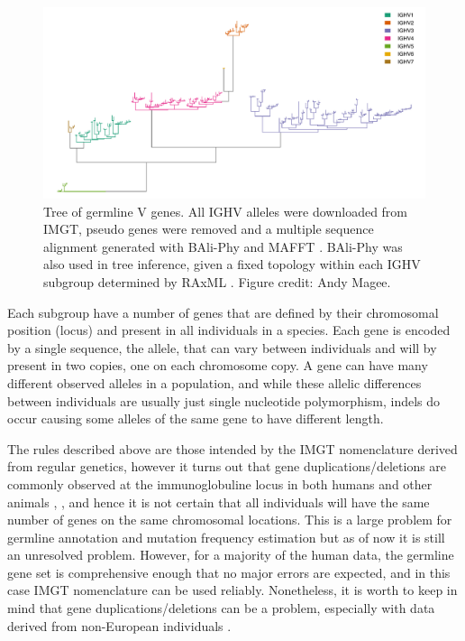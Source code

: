 \begin{figure}
    \centering
    \includegraphics[width=1\textwidth]{figures/tree_right_side_up.pdf}
    \caption{
        \label{fig:IGHV_tree}
        Tree of germline V genes.
        All IGHV alleles were downloaded from IMGT, pseudo genes were removed and a multiple sequence alignment generated with BAli-Phy \cite{suchard2006bali} and MAFFT \cite{katoh2013mafft}.
        BAli-Phy was also used in tree inference, given a fixed topology within each IGHV subgroup determined by RAxML \cite{stamatakis2008rapid}.
        Figure credit: Andy Magee.
    }
\end{figure}


Each subgroup have a number of genes that are defined by their chromosomal position (locus) and present in all individuals in a species.
Each gene is encoded by a single sequence, the allele, that can vary between individuals and will by present in two copies, one on each chromosome copy.
A gene can have many different observed alleles in a population, and while these allelic differences between individuals are usually just single nucleotide polymorphism, indels do occur causing some alleles of the same gene to have different length.

The rules described above are those intended by the IMGT nomenclature derived from regular genetics, however it turns out that gene duplications/deletions are commonly observed at the immunoglobuline locus in both humans \cite{scheepers2015ability} and other animals \cite{collins2015mouse}, \cite{corcoran2016production}, and hence it is not certain that all individuals will have the same number of genes on the same chromosomal locations.
This is a large problem for germline annotation and mutation frequency estimation but as of now it is still an unresolved problem.
However, for a majority of the human data, the germline gene set is comprehensive enough that no major errors are expected, and in this case IMGT nomenclature can be used reliably.
Nonetheless, it is worth to keep in mind that gene duplications/deletions can be a problem, especially with data derived from non-European individuals \cite{scheepers2015ability}.







